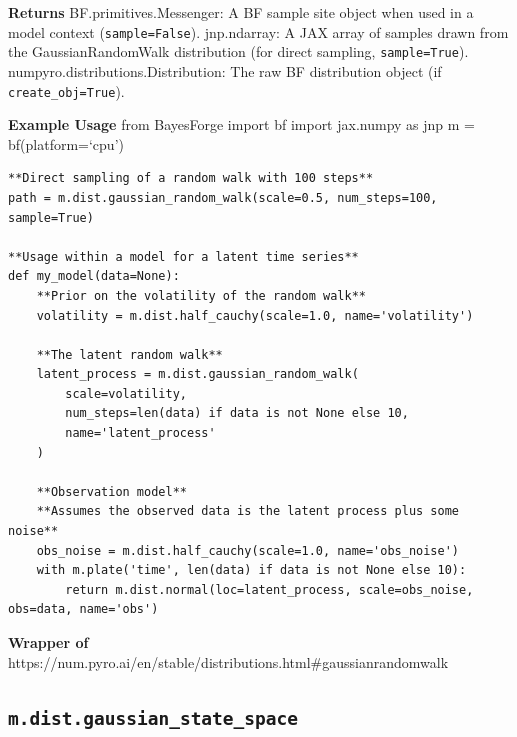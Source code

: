 \documentclass[
  letterpaper,
  DIV=11,
  numbers=noendperiod]{scrartcl}
\begin{document}
\textbf{Returns} BF.primitives.Messenger: A BF sample site object when
used in a model context (\texttt{sample=False}). jnp.ndarray: A JAX
array of samples drawn from the GaussianRandomWalk distribution (for
direct sampling, \texttt{sample=True}).
numpyro.distributions.Distribution: The raw BF distribution object (if
\texttt{create\_obj=True}).

\textbf{Example Usage} from BayesForge import bf import jax.numpy as jnp
m = bf(platform=`cpu')

\begin{verbatim}
**Direct sampling of a random walk with 100 steps**
path = m.dist.gaussian_random_walk(scale=0.5, num_steps=100, sample=True)

**Usage within a model for a latent time series**
def my_model(data=None):
    **Prior on the volatility of the random walk**
    volatility = m.dist.half_cauchy(scale=1.0, name='volatility')
    
    **The latent random walk**
    latent_process = m.dist.gaussian_random_walk(
        scale=volatility,
        num_steps=len(data) if data is not None else 10,
        name='latent_process'
    )
    
    **Observation model**
    **Assumes the observed data is the latent process plus some noise**
    obs_noise = m.dist.half_cauchy(scale=1.0, name='obs_noise')
    with m.plate('time', len(data) if data is not None else 10):
        return m.dist.normal(loc=latent_process, scale=obs_noise, obs=data, name='obs')
\end{verbatim}

\textbf{Wrapper of}
https://num.pyro.ai/en/stable/distributions.html\#gaussianrandomwalk

\subsection{\texorpdfstring{\texttt{m.dist.gaussian\_state\_space}}{m.dist.gaussian\_state\_space}}\label{gaussian_state_space}
\end{document}
